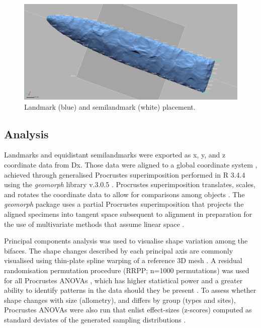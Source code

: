 \documentclass[review]{elsarticle}
\begin{document}
\begin{figure}[ht]\centering
\includegraphics[width=\linewidth]{Fig1a}
\caption{Landmark (blue) and semilandmark (white) placement.}
\label{fig:Fig1a}
\end{figure}

\subsection{Analysis}

Landmarks and equidistant semilandmarks were exported as x, y, and z coordinate data from Dx. Those data were aligned to a global coordinate system \citep{RN11622,RN11623,RN11563}, achieved through generalised Procrustes superimposition \citep{RN478} performed in R 3.4.4 \citep{R} using the \textit{geomorph} library v.3.0.5 \citep{RN11530,RN1774}. Procrustes superimposition translates, scales, and rotates the coordinate data to allow for comparisons among objects \citep{RN11564,RN478}. The \textit{geomorph} package uses a partial Procrustes superimposition that projects the aligned specimens into tangent space subsequent to alignment in preparation for the use of multivariate methods that assume linear space \citep{RN1646,RN11563}.

Principal components analysis \citep{RN1746} was used to visualise shape variation among the bifaces. The shape changes described by each principal axis are commonly visualised using thin-plate spline warping of a reference 3D mesh \citep{RN1731,RN479}. A residual randomisation permutation procedure (RRPP; n=1000 permutations) was used for all Procrustes ANOVAs \citep{RN1655}, which has higher statistical power and a greater ability to identify patterns in the data should they be present \citep{RN1719}. To assess whether shape changes with size (allometry), and differs by group (types and sites), Procrustes ANOVAs \citep{RN1749} were also run that enlist effect-sizes (z-scores) computed as standard deviates of the generated sampling distributions \citep{RN1756}. 
\end{document}

